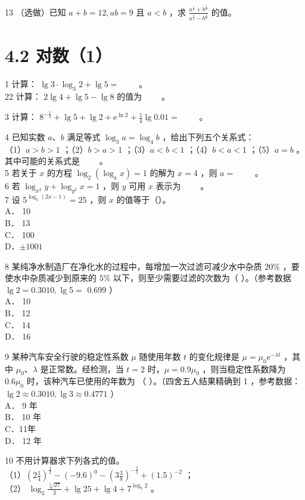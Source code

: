 \documentclass[10pt]{article}
\begin{document}
13 （选做）已知 \(a+b=12, a b=9\) 且 \(a<b\) ，求 \(\frac{a^{\frac{1}{2}}+b^{\frac{1}{2}}}{a^{\frac{1}{2}}-b^{\frac{1}{2}}}\) 的值。

\section*{4.2 对数（1）}
1 计算： \(\lg 3 \cdot \log _{3} 2+\lg 5=\) \(\qquad\)。\\
22 计算： \(2 \lg 4+\lg 5-\lg 8\) 的值为 \(\qquad\)。

3 计算： \(8^{-\frac{1}{3}}+\lg 5+\lg 2+\mathrm{e}^{\ln 2}+\frac{1}{4} \lg 0.01=\) \(\qquad\)。

4 已知实数 \(a 、 b\) 满足等式 \(\log _{3} a=\log _{4} b\) ，给出下列五个关系式：\\
（1）\(a>b>1\) ；（2）\(b>a>1\) ；（3）\(a<b<1\) ；（4）\(b<a<1\) ；（5）\(a=b\) 。其中可能的关系式是 \(\qquad\)。\\
5 若关于 \(x\) 的方程 \(\log _{2}\left(\log _{a} x\right)=1\) 的解为 \(x=4\) ，则 \(a=\) \(\qquad\)。\\
6 若 \(\log _{x^{2}} y+\log _{y^{2}} x=1\) ，则 \(y\) 可用 \(x\) 表示为 \(\qquad\)。\\
7 设 \(5^{\log _{5}(2 x-1)}=25\) ，则 \(x\) 的值等于（）。\\
A． 10\\
B． 13\\
C． 100\\
D．\(\pm 1001\)

8 某纯净水制造厂在净化水的过程中，每增加一次过滤可减少水中杂质 \(20 \%\) ，要使水中杂质减少到原来的 \(5 \%\) 以下，则至少需要过滤的次数为（ ）。（参考数据 \(\lg 2=0.3010, \lg 5=\) 0.699 ）\\
A． 10\\
B． 12\\
C． 14\\
D． 16

9 某种汽车安全行驶的稳定性系数 \(\mu\) 随使用年数 \(t\) 的变化规律是 \(\mu=\mu_{0} \mathrm{e}^{-\lambda t}\) ，其中 \(\mu_{0} 、 \lambda\) 是正常数。经检测，当 \(t=2\) 时，\(\mu=0.9 \mu_{0}\) ，则当稳定性系数降为 \(0.6 \mu_{0}\) 时，该种汽车已使用的年数为 （ ）。（四舍五人结果精确到 1 ，参考数据： \(\lg 2 \approx 0.3010, \lg 3 \approx 0.4771\) ）\\
A． 9 年\\
B． 10 年\\
C．11年\\
D． 12 年

10 不用计算器求下列各式的值。\\
（1）\(\left(2 \frac{1}{4}\right)^{\frac{1}{2}}-(-9.6)^{0}-\left(3 \frac{3}{8}\right)^{-\frac{2}{3}}+(1.5)^{-2}\) ；\\
（2） \(\log _{3} \frac{\sqrt[4]{27}}{3}+\lg 25+\lg 4+7^{\log _{7} 2}\) 。
\end{document}
